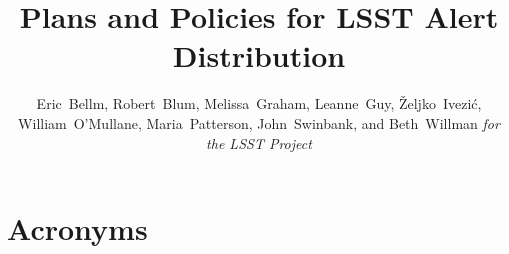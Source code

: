 \documentclass[DM,toc]{lsstdoc}
\title{Plans and Policies for LSST Alert Distribution}
\author{
Eric~Bellm,
Robert~Blum,
Melissa~Graham,
Leanne~Guy,
\v{Z}eljko~Ivezi\'{c},
William~O'Mullane,
Maria~Patterson,
John~Swinbank,
and Beth~Willman
\emph{for the LSST Project}
}
\begin{document}
\maketitle









\clearpage

\section{Acronyms}



\end{document}
